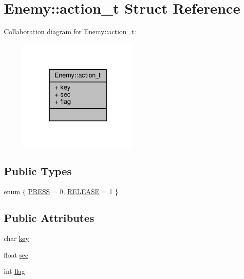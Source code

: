 \hypertarget{structEnemy_1_1action__t}{}\section{Enemy\+:\+:action\+\_\+t Struct Reference}
\label{structEnemy_1_1action__t}


Collaboration diagram for Enemy\+:\+:action\+\_\+t\+:
\nopagebreak
\begin{figure}[H]
\begin{center}
\leavevmode
\includegraphics[width=168pt]{structEnemy_1_1action__t__coll__graph}
\end{center}
\end{figure}
\subsection*{Public Types}
\begin{DoxyCompactItemize}
\item 
enum \{ \hyperlink{structEnemy_1_1action__t_ab643a5e1949db5ccb006773412a9c12ba8786ddb5e8d54dfae1e13ae70adc113f}{P\+R\+E\+S\+S} = 0, 
\hyperlink{structEnemy_1_1action__t_ab643a5e1949db5ccb006773412a9c12ba4b7d9521cd8ba7262f1576b428580f78}{R\+E\+L\+E\+A\+S\+E} = 1
 \}
\end{DoxyCompactItemize}
\subsection*{Public Attributes}
\begin{DoxyCompactItemize}
\item 
char \hyperlink{structEnemy_1_1action__t_a107762072964a000ee4185e562d5f583}{key}
\item 
float \hyperlink{structEnemy_1_1action__t_a6098f9876645d5c23c656de57b51e24d}{sec}
\item 
int \hyperlink{structEnemy_1_1action__t_aea2f6b58cefc18ce0537e216cee3e96e}{flag}
\end{DoxyCompactItemize}


